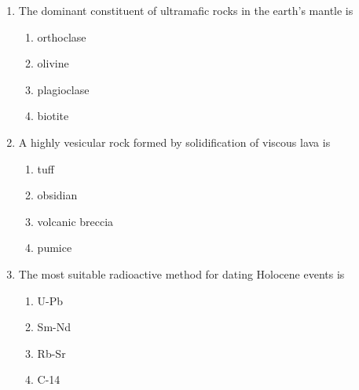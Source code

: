 \documentclass[journal,12pt,onecolumn]{IEEEtran}
\theoremstyle{remark}
\begin{document}
\begin{enumerate}
\item The dominant constituent of ultramafic rocks in the earth's mantle is
\begin{multicols}{2}
\begin{enumerate}
\item orthoclase  
\item olivine  
\item plagioclase  
\item biotite  
\end{enumerate}
\end{multicols}

\item A highly vesicular rock formed by solidification of viscous lava is
\begin{multicols}{4}
\begin{enumerate}
\item tuff  
\item obsidian  
\item volcanic breccia  
\item pumice  
\end{enumerate}
\end{multicols}

\item The most suitable radioactive method for dating Holocene events is
\begin{multicols}{4}
\begin{enumerate}
\item U-Pb  
\item Sm-Nd  
\item Rb-Sr  
\item C-14  
\end{enumerate}
\end{multicols}

\end{enumerate}
\end{document}
